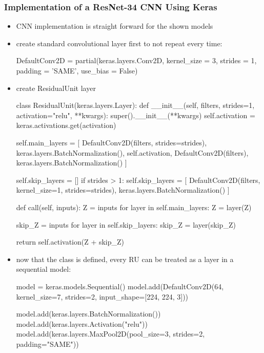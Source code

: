 \documentclass[12pt,a4paper]{article}
\begin{document}
\subsubsection{Implementation of a ResNet-34 CNN Using Keras} %
\label{ssub:implementation_of_a_resnet_34_cnn_using_keras}
\begin{itemize}
  \item CNN implementation is straight forward for the shown models
  \item create standard convolutional layer first to not repeat every time:
  \begin{python}
    DefaultConv2D = partial(keras.layers.Conv2D, kernel_size = 3,
                            strides = 1, padding = 'SAME', use_bias = False)
  \end{python}
  \item create ResidualUnit layer
  \begin{python}
    class ResidualUnit(keras.layers.Layer):
      def __init__(self, filters, strides=1, 
                  activation="relu", **kwargs):
        super().__init__(**kwargs)
        self.activation = keras.activations.get(activation)

        self.main_layers = [
              DefaultConv2D(filters, strides=strides),
              keras.layers.BatchNormalization(),
              self.activation,
              DefaultConv2D(filters),
              keras.layers.BatchNormalization()
          ]
        
        self.skip_layers = []
        if strides > 1:
          self.skip_layers = [
            DefaultConv2D(filters, kernel_size=1, strides=strides),
                          keras.layers.BatchNormalization()
                          ]

      def call(self, inputs):
        Z = inputs
        for layer in self.main_layers:
          Z = layer(Z)

        skip_Z = inputs
        for layer in self.skip_layers:
          skip_Z = layer(skip_Z)

        return self.activation(Z + skip_Z)
  \end{python}
  \item now that the class is defined, every RU can be treated as a layer in a sequential model:
  \begin{python}
    model = keras.models.Sequential()
    model.add(DefaultConv2D(64, kernel_size=7, strides=2,
                            input_shape=[224, 224, 3]))

    model.add(keras.layers.BatchNormalization())
    model.add(keras.layers.Activation("relu"))
    model.add(keras.layers.MaxPool2D(pool_size=3, strides=2, padding="SAME"))


\end{python}
\end{itemize}
\end{document}
